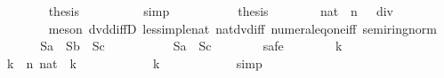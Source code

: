 \begin{isabellebody}
\ \ \ \ \ \ \isamarkupfalse%
\ {\isacharquery}thesis\isanewline
\ \ \ \ \ \ \ \ \isamarkupfalse%
\ simp\isanewline
\ \ \ \ \isamarkupfalse%
\isanewline
\ \ \ \ \isamarkupfalse%
\ {\isacharquery}thesis\isanewline
\ \ \ \ \ \ \isamarkupfalse%
\ {\isacharbackquoteopen}{\isacharparenleft}{\isacharparenleft}{}{\isacharcolon}{\isacharcolon}nat{\isacharparenright}\ {\isacharcircum}\ n\ {\isacharplus}\ {}{\isacharparenright}\ div\ {}\ {\isachargreater}\ {}{\isacharbackquoteclose}\isanewline
\ \ \ \ \ \ \isamarkupfalse%
\ {\isacharparenleft}meson\ dvd{\isacharunderscore}diffD{}\ less{\isacharunderscore}imp{\isacharunderscore}le{\isacharunderscore}nat\ nat{\isacharunderscore}dvd{\isacharunderscore}{}{\isacharunderscore}iff{\isacharunderscore}{}\ numeral{\isacharunderscore}eq{\isacharunderscore}one{\isacharunderscore}iff\ semiring{\isacharunderscore}norm{\isacharparenleft}{}{}{\isacharparenright}{\isacharparenright}\isanewline
\ \ \isamarkupfalse%
\isanewline
\isanewline
\ \ \isamarkupfalse%
\ {\isachardoublequoteopen}{\isacharparenleft}{\isacharquery}Sa\ {\isasymunion}\ {\isacharquery}Sb{\isacharparenright}\ {\isasyminter}\ {\isacharquery}Sc\ {\isacharequal}\ {\isacharbraceleft}{\isacharbraceright}{\isachardoublequoteclose}\isanewline
\ \ \isamarkupfalse%
{\isacharminus}\isanewline
\ \ \ \ \isamarkupfalse%
\ {\isachardoublequoteopen}{\isacharquery}Sa\ {\isasyminter}\ {\isacharquery}Sc\ {\isacharequal}\ {\isacharbraceleft}{\isacharbraceright}{\isachardoublequoteclose}\isanewline
\ \ \ \ \isamarkupfalse%
\ safe\isanewline
\ \ \ \ \ \ \isamarkupfalse%
\ k\isanewline
\ \ \ \ \ \ \isamarkupfalse%
\ {\isachardoublequoteopen}k\ {\isasymin}\ {\isacharbraceleft}{}{\isachardot}{\isachardot}{\isacharless}n{\isacharbraceright}{\isachardoublequoteclose}\ {\isachardoublequoteopen}{\isacharparenleft}{}{\isacharcolon}{\isacharcolon}nat{\isacharparenright}\ {\isacharcircum}\ k\ {\isacharequal}\ {}{\isachardoublequoteclose}\isanewline
\ \ \ \ \ \ \isamarkupfalse%
\ {\isachardoublequoteopen}{}\ {\isacharcircum}\ k\ {\isasymin}\ {\isacharbraceleft}{\isacharbraceright}{\isachardoublequoteclose}\isanewline
\ \ \ \ \ \ \ \ \isamarkupfalse%
\ simp\isanewline
\ \ \ \ \isamarkupfalse%

\end{isabellebody}
